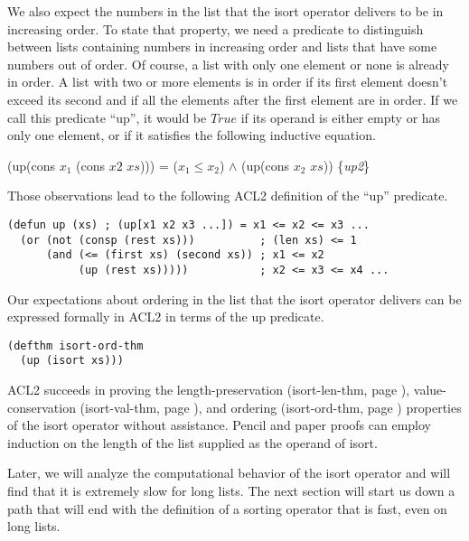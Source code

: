 We also expect the numbers in the list that the isort operator
delivers to be in increasing order.
To state that property, we need a predicate
to distinguish between lists containing numbers in increasing order
and lists that have some numbers out of order.
Of course, a list with only one element or none is already
in order. A list with two or more elements is in order
if its first element doesn't exceed its second and if
all the elements after the first element are in order.
If we call this predicate ``up'', it would be $True$
if its operand is either empty or has only one element,
or if it satisfies the
following inductive equation.

\hspace{1cm} (up(cons $x_1$ (cons $x2$ $xs$))) = ($x_1 \le x_2$) $\wedge$ (up(cons $x_2$ $xs$))
\hfill \{\emph{up2}\}

Those observations lead to the following ACL2 definition of the ``up'' predicate.

\label{defun:up}
\begin{Verbatim}
(defun up (xs) ; (up[x1 x2 x3 ...]) = x1 <= x2 <= x3 ...
  (or (not (consp (rest xs)))          ; (len xs) <= 1
      (and (<= (first xs) (second xs)) ; x1 <= x2
           (up (rest xs)))))           ; x2 <= x3 <= x4 ...
\end{Verbatim}

Our expectations about ordering in the list that the isort operator
delivers can be expressed formally in ACL2 in terms of the up predicate.

\label{defthm:isort-ord-thm}
\begin{Verbatim}
(defthm isort-ord-thm
  (up (isort xs)))
\end{Verbatim}

ACL2 succeeds in proving the length-preservation
(isort-len-thm, page \pageref{defthm:isort-len}),
value-conservation
(isort-val-thm, page \pageref{defthm:isort-val}), and ordering
(isort-ord-thm, page \pageref{defthm:isort-ord-thm}) properties
of the isort operator without assistance.
Pencil and paper proofs can employ induction on the length
of the list supplied as the operand of isort.

Later, we will analyze the computational behavior of the isort operator
and will find that it is extremely slow for long lists.
The next section will start us down a path that will
end with the definition of a sorting operator
that is fast, even on long lists.

